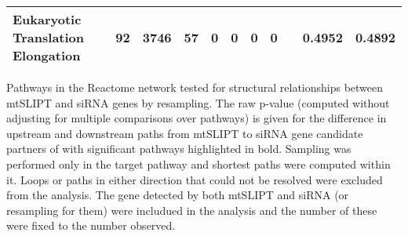 \begin{table*}[!htb]
{{\begin{threeparttable}
\begin{tabular}{l|cc|cc|cccc|cc}
  \rowcolor{black!5}
Eukaryotic Translation Elongation         & 92    & 3746   & 57   & 0     & 0    & 0    & 0       &                   & 0.4952 & 0.4892   \\ 
\hline
\end{tabular}
\begin{tablenotes}
\raggedright \small
Pathways in the Reactome network tested for structural relationships between mtSLIPT and \gls{siRNA} genes by resampling. The raw p-value (computed without adjusting for multiple comparisons over pathways) is given for the difference in upstream and downstream paths from mtSLIPT to \gls{siRNA} gene candidate partners of  with significant pathways highlighted in bold. Sampling was performed only in the target pathway and shortest paths were computed within it. Loops or paths in either direction that could not be resolved were excluded from the analysis. The gene detected by both mtSLIPT and \gls{siRNA} (or resampling for them) were includued in the analysis and the number of these were fixed to the number observed.
\end{tablenotes}
\end{threeparttable}
}
}
\end{table*}


\FloatBarrier
